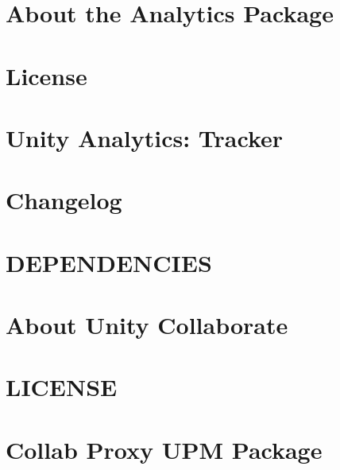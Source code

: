 \let\mypdfximage\pdfximage\def\pdfximage{\immediate\mypdfximage}\documentclass[twoside]{book}
\newcommand{\+}{\discretionary{\mbox{\scriptsize$\hookleftarrow$}}{}{}}
\begin{document}
\chapter{About the Analytics Package}
\label{autotoc_md79}

\chapter{License}
\label{md_Library_PackageCache_com_8unity_8analytics_0d3_82_82_License}

\chapter{Unity Analytics\+: Tracker}
\label{md_Library_PackageCache_com_8unity_8analytics_0d3_82_82_README}

\chapter{Changelog}
\label{autotoc_md85}

\chapter{D\+E\+P\+E\+N\+D\+E\+N\+C\+I\+ES}
\label{md_Library_PackageCache_com_8unity_8collab-proxy_0d1_82_815_DEPENDENCIES}

\chapter{About Unity Collaborate}
\label{autotoc_md93}

\chapter{L\+I\+C\+E\+N\+SE}
\label{md_Library_PackageCache_com_8unity_8collab-proxy_0d1_82_815_LICENSE}

\chapter{Collab Proxy U\+PM Package}
\label{autotoc_md94}

\end{document}
